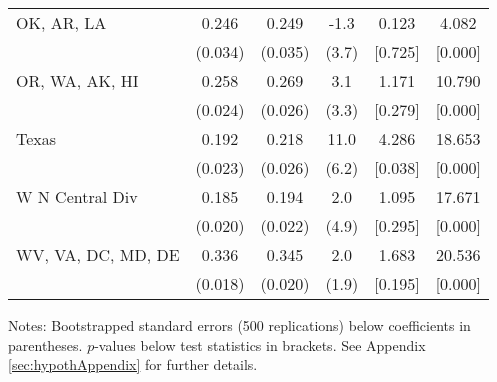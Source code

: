 \begin{landscape}
\begin{table}[ht]
{\begin{threeparttable}
\begin{tabular}{lccccc}
OK, AR, LA & 0.246 & 0.249 & -1.3 & 0.123 & 4.082 \\ 
 & (0.034) & (0.035) & (3.7) & [0.725] & [0.000] \\ 
OR, WA, AK, HI & 0.258 & 0.269 & 3.1 & 1.171 & 10.790 \\ 
 & (0.024) & (0.026) & (3.3) & [0.279] & [0.000] \\ 
Texas & 0.192 & 0.218 & 11.0 & 4.286 & 18.653 \\ 
 & (0.023) & (0.026) & (6.2) & [0.038] & [0.000] \\ 
W N Central Div & 0.185 & 0.194 & 2.0 & 1.095 & 17.671 \\ 
 & (0.020) & (0.022) & (4.9) & [0.295] & [0.000] \\ 
WV, VA, DC, MD, DE & 0.336 & 0.345 & 2.0 & 1.683 & 20.536 \\ 
 & (0.018) & (0.020) & (1.9) & [0.195] & [0.000] \\ 
\bottomrule
\end{tabular}
{\footnotesize {\raggedright Notes: Bootstrapped standard errors (500 replications) below coefficients in parentheses. $p$-values below test statistics in brackets. See Appendix \ref{sec:hypothAppendix} for further details.}}
\end{threeparttable}
}
\end{table}
\end{landscape}
